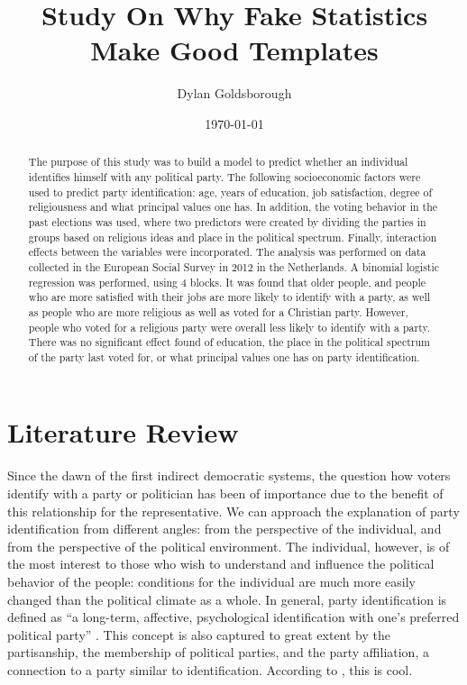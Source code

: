 \documentclass{stats_apa}
\title{Study On Why Fake Statistics Make Good Templates}
\author{Dylan Goldsborough}
\date{\today}
\begin{document}
\maketitle

\begin{abstract}
\noindent
The purpose of this study was to build a model to predict whether an individual identifies himself with any political party. The following socioeconomic factors were used to predict party identification: age, years of education, job satisfaction, degree of religiousness and what principal values one has. In addition, the voting behavior in the past elections was used, where two predictors were created by dividing the parties in groups based on religious ideas and place in the political spectrum. Finally, interaction effects between the variables were incorporated. The analysis was performed on data collected in the European Social Survey in 2012 in the Netherlands. A binomial logistic regression was performed, using 4 blocks. It was found that older people, and people who are more satisfied with their jobs are more likely to identify with a party, as well as people who are more religious as well as voted for a Christian party. However, people who voted for a religious party were overall less likely to identify with a party. There was no significant effect found of education, the place in the political spectrum of the party last voted for, or what principal values one has on party identification.
\end{abstract}

\newpage

\section*{Literature Review}

Since the dawn of the first indirect democratic systems, the question how voters identify with a party or politician has been of importance due to the benefit of this relationship for the representative. We can approach the explanation of party identification from different angles: from the perspective of the individual, and from the perspective of the political environment. The individual, however, is of the most interest to those who wish to understand and influence the political behavior of the people: conditions for the individual are much more easily changed than the political climate as a whole.
In general, party identification is defined as “a long-term, affective, psychological identification with one’s preferred political party” \cite[p.20]{mcboat2016cool}. This concept is also captured to great extent by the partisanship, the membership of political parties, and the party affiliation, a connection to a party similar to identification. According to , this is cool.
\end{document}
